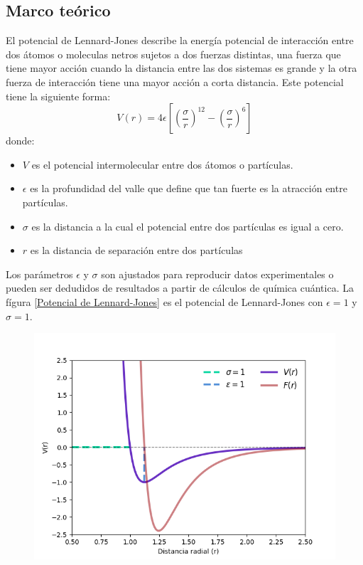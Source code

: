 \documentclass[12pt,letterpaper]{article}
\begin{document}
\begin{multicols}{2}
\section*{Marco teórico}
El potencial de Lennard-Jones describe la energía potencial de interacción entre dos átomos o moleculas netros sujetos a dos fuerzas distintas, una fuerza que tiene mayor acción cuando la distancia entre las dos sistemas es grande y la otra fuerza de interacción tiene una mayor acción a corta distancia. Este potencial tiene la siguiente forma:
\begin{equation}
    \label{Potencial de Lennard-Jones}
    V(r) = 4 \epsilon \left[\left(\frac{\sigma}{r} \right)^{12} - \left(\frac{\sigma}{r} \right)^6 \right]
\end{equation}
donde:
\begin{itemize}
    \item $V$ es el potencial intermolecular entre dos átomos o partículas.
    \item $\epsilon$ es la profundidad del valle que define que tan fuerte es la atracción entre partículas.
    \item $\sigma$ es la distancia a la cual el potencial entre dos partículas es igual a cero.
    \item $r$ es la distancia de separación entre dos partículas
\end{itemize}
Los parámetros $\epsilon$ y $\sigma$ son ajustados para reproducir datos experimentales o pueden ser dedudidos de resultados a partir de cálculos de química cuántica. La fígura \ref{Potencial de Lennard-Jones} es el potencial de Lennard-Jones con $\epsilon=1$ y $\sigma=1$.
\begin{figure}[H]
    \centering
    \includegraphics[scale=0.45]{../Graphics/Potencial.png}

\end{figure}
\end{multicols}
\end{document}
